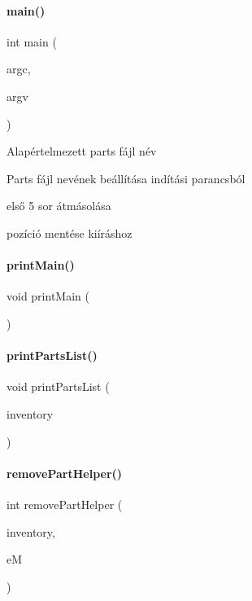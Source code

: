 \mbox{\label{main_8cpp_a3c04138a5bfe5d72780bb7e82a18e627}} 
\paragraph{\texorpdfstring{main()}{main()}}
{\footnotesize\ttfamily int main (\begin{DoxyParamCaption}\item[{int}]{argc,  }\item[{char $\ast$$\ast$}]{argv }\end{DoxyParamCaption})}

Alapértelmezett parts fájl név

Parts fájl nevének beállítása indítási parancsból

első 5 sor átmásolása

pozíció mentése kiíráshoz \mbox{\label{main_8cpp_aa8348016f7273e63d47917126e8f9c69}} 
\paragraph{\texorpdfstring{printMain()}{printMain()}}
{\footnotesize\ttfamily void print\+Main (\begin{DoxyParamCaption}{ }\end{DoxyParamCaption})}

\mbox{\label{main_8cpp_a70c4e63bce818eb0a35f6403066b4263}} 
\paragraph{\texorpdfstring{printPartsList()}{printPartsList()}}
{\footnotesize\ttfamily void print\+Parts\+List (\begin{DoxyParamCaption}\item[{\mbox{\hyperlink{class_inventory}{Inventory}} \&}]{inventory }\end{DoxyParamCaption})}

\mbox{\label{main_8cpp_ab1c45050c0d088f602e43276598cc469}} 
\paragraph{\texorpdfstring{removePartHelper()}{removePartHelper()}}
{\footnotesize\ttfamily int remove\+Part\+Helper (\begin{DoxyParamCaption}\item[{\mbox{\hyperlink{class_inventory}{Inventory}} \&}]{inventory,  }\item[{enum \mbox{\hyperlink{main_8h_adbc27074b7dcd54cd4578936c6329d02}{enum\+Menu}} \&}]{eM }\end{DoxyParamCaption})}

